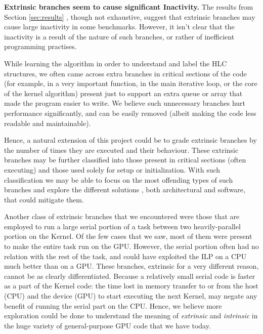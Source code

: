 \label{sec:conclusion}
\par{
\textbf {Extrinsic branches seem to cause significant Inactivity.} The results from Section \ref{sec:results}
, though not exhaustive, suggest that extrinsic branches may cause large inactivity in some benchmarks. However, it isn't clear
that the inactivity is a result of the nature of such branches, or rather of inefficient programming
practises. 

While learning the algorithm in order to understand and label the HLC structures, we often
came across extra branches in critical sections of the code (for example, in a very important function, 
in the main iterative loop, or the core of the kernel algorithm) present just to support an extra queue
or array that made the program easier to write. We believe such unnecessary branches hurt performance
significantly, and can be easily removed (albeit making the code less readable and maintainable). 

Hence, a natural extension of this project could be to grade extrinsic branches by the number of times they are 
executed and their behaviour. These extrinsic branches may be further classified into those present in
critical sections (often executing) and those used solely for setup or initialization. With such 
classification we may be able to focus on the most offending types of such branches and explore the different solutions
, both architectural and software, that could mitigate them.

Another class of extrinsic branches that we encountered were those that are employed to run a large serial
portion of a task between two heavily-parallel portion on the Kernel. Of the few cases that we saw, most of
them were present to make the entire task run on the GPU. However, the serial portion often had no relation with
the rest of the task, and could have exploited the ILP on a CPU much better than on a GPU. These branches,
extrinsic for a very different reason, cannot be as clearly differentiated. Because a relatively small 
serial code is faster as a part of the Kernel code: the time lost in memory transfer to or from the host (CPU)
and the device (GPU) to start executing the next Kernel, may negate any benefit of running the serial part on the CPU.
Hence, we believe more exploration could be done to understand the meaning of \textsl{extrinsic} and \textsl{intrinsic}
in the huge variety of general-purpose GPU code that we have today.
}

